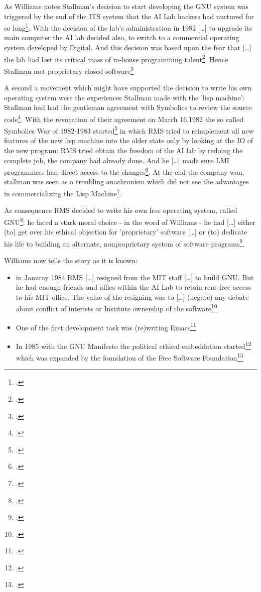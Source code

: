 \documentclass[DIV=calc,BCOR=5mm,11pt,headings=small,oneside,abstract=true, toc=bib]{scrartcl}
\begin{document}
As Williams notes \glqq{}Stallman's decision to start developing the GNU
system was triggered by the end of the ITS system that the AI Lab hackers
had nurtured for so long\grqq{}\footcite[][91]{Williams2002a}. With the decision
of the \glqq{}lab's administration\grqq{} in 1982 \glqq{}[\ldots] to
upgrade its main computer\grqq{} the AI lab decided also, to switch to
\glqq{}a commercial operating system developed by Digital\grqq{}. And this
decision was based upon the fear that \glqq{}[\ldots] the lab had lost
its critical mass of in-house programming
talent\grqq{}\footcite[cf][92]{Williams2002a}. Hence Stallman met proprietary
closed software\footcite[cf][92]{Williams2002a}

A second a movement which might have supported the decision to write his own
operating system were the experiences Stallman made with the 'lisp machine':
Stallman had had the \glqq{}gentleman agreement\grqq{} with Symbolics to
\glqq{}review\grqq{} the source code\footcite[cf][95]{Williams2002a}. With the
revocation of their agreement on March 16,1982
the so called \glqq{}Symbolics War of 1982-1983\grqq{}
started\footcite[cf][96]{Williams2002a} in which RMS tried to reimplement all
new features of the new lisp machine into the older state only by looking at
the IO of the new program: RMS tried obtain the freedom of the AI lab by redoing
the complete job, the company had already done. And he \glqq{}[\ldots] made
sure LMI programmers had direct access to the
changes\grqq{}\footcite[cf][97]{Williams2002a}. At the end the company won,
stallman was seen \glqq{}as a troubling anachronism\grqq{} which did not see the
advantages \glqq{}in commercializing the Lisp
Machine\grqq{}\footcite[cf][97]{Williams2002a}.

As consequence RMS decided to write his own free operating system, called
GNU\footcite[cf][101]{Williams2002a}: he faced a \glqq{}stark moral
choice\grqq{} - in the word of Williams - he had \glqq{}[\ldots] either
(to) get over his ethical objection for 'proprietary' software [\ldots]
or (to) dedicate his life to building an alternate, nonproprietary
system of software programs\grqq{}\footcite[cf][101]{Williams2002a}.

Williams now tells the story as it is known: 
\begin{itemize}
   \item in Januray 1984 RMS \glqq{}[\ldots]
  resigned from the MIT staff [\ldots] to build GNU\grqq{}. But he had
  \glqq{}enough friends and allies within the AI Lab to retain rent-free
  access to his MIT office\grqq{}. The value of the resigning was to
  \glqq{}[\ldots] (negate) any debate about conflict of interists or
  Institute ownership of the software\grqq{}\footcite[cf][102]{Williams2002a}
  \item One of the first development task was (re)writing
  Emacs\footcite[cf][105]{Williams2002a}
  \item In 1985 with the GNU Manifesto the political ethical embeddation
  started\footcite[cf][105]{Williams2002a} which was expanded by the foundation
  of the Free Software Foundation\footcite[cf][106]{Williams2002a} 
\end{itemize}
\end{document}
